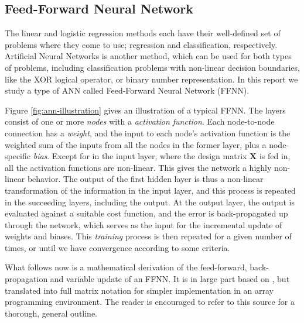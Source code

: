 \documentclass[]{article}
\begin{document}
\subsection{Feed-Forward Neural Network}
The linear and logistic regression methods each have their well-defined set of problems where they come to use; regression and classification, respectively. Artificial Neural Networks is another method, which can be used for both types of problems, including classification problems with non-linear decision boundaries, like the XOR logical operator, or binary number representation. In this report we study a type of ANN called Feed-Forward Neural Network (FFNN).

Figure \ref{fig:ann-illustration} gives an illustration of a typical FFNN. The layers consist of one or more \textit{nodes} with a \textit{activation function}. Each node-to-node connection has a \textit{weight}, and the input to each node's activation function is the weighted sum of the inputs from all the nodes in the former layer, plus a node-specific \textit{bias}. Except for in the input layer, where the design matrix $\mathbf{X}$ is fed in, all the activation functions are non-linear. This gives the network a highly non-linear behavior. The output of the first hidden layer is thus a non-linear transformation of the information in the input layer, and this process is repeated in the succeeding layers, including the output. At the output layer, the output is evaluated against a suitable cost function, and the error is back-propagated up through the network, which serves as the input for the incremental update of weights and biases. This \textit{training} process is then repeated for a given number of times, or until we have convergence according to some criteria.

\vspace{5mm}

What follows now is a mathematical derivation of the feed-forward, back-propagation and variable update of an FFNN. It is in large part based on \cite{fys-stk4155-notes}, but translated into full matrix notation for simpler implementation in an array programming environment. The reader is encouraged to refer to this source for a thorough, general outline.
\end{document}
